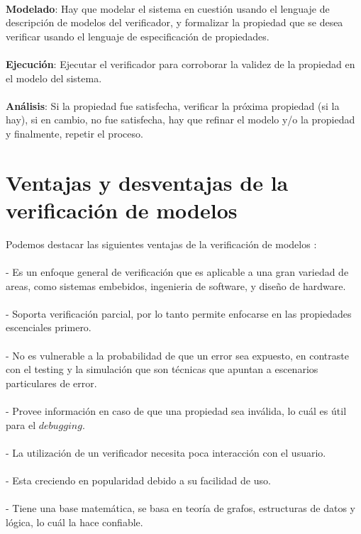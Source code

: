 \\
\textbf{Modelado}: Hay que modelar el sistema en cuestión usando el lenguaje de descripción de modelos del verificador, y formalizar la propiedad que se desea verificar usando el lenguaje de especificación de propiedades.\\
\\
\textbf{Ejecución}: Ejecutar el verificador para corroborar la validez de la propiedad en el modelo del sistema.\\
\\
\textbf{Análisis}: Si la propiedad fue satisfecha, verificar la próxima propiedad (si la hay), si en cambio, no fue satisfecha, hay que refinar el modelo y/o la propiedad y finalmente, repetir el proceso.\\

\section{Ventajas y desventajas de la verificación de modelos}
\noindent Podemos destacar las siguientes ventajas de la verificación de modelos \cite{Baier:2}:\\
\\
- Es un enfoque general de verificación que es aplicable a una gran variedad de areas, como sistemas embebidos, ingenieria de software, y diseño de hardware.\\
\\
- Soporta verificación parcial, por lo tanto permite enfocarse en las propiedades escenciales primero.\\
\\
- No es vulnerable a la probabilidad de que un error sea expuesto, en contraste con el testing y la simulación que son técnicas que apuntan a escenarios particulares de error.\\
\\
- Provee información en caso de que una propiedad sea inválida, lo cuál es útil para el $debugging$.\\
\\
- La utilización de un verificador necesita poca interacción con el usuario.\\
\\
- Esta creciendo en popularidad debido a su facilidad de uso.\\
\\
- Tiene una base matemática, se basa en teoría de grafos, estructuras de datos y lógica, lo cuál la hace confiable.\\
\\
